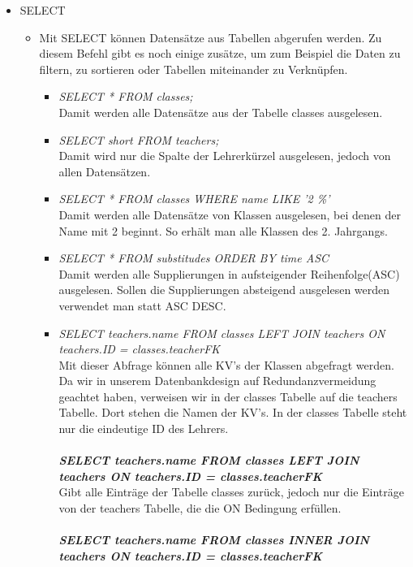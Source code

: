 \begin{itemize}
    \item SELECT
    	\begin{itemize}
	    	\item Mit SELECT können Datensätze aus Tabellen abgerufen werden. Zu diesem Befehl gibt es noch einige zusätze, um zum Beispiel die Daten zu filtern, zu sortieren oder Tabellen miteinander zu Verknüpfen.
	    	\begin{itemize}
		    	\item \textit{SELECT * FROM classes;}\\
		    		Damit werden alle Datensätze aus der Tabelle classes ausgelesen.
		    	\item \textit{SELECT short FROM teachers;}\\
			    	Damit wird nur die Spalte der Lehrerkürzel ausgelesen, jedoch von allen Datensätzen.
		    	\item \textit{SELECT * FROM classes WHERE name LIKE '2 \%'}\\
		    		Damit werden alle Datensätze von Klassen ausgelesen, bei denen der Name mit 2 beginnt. So erhält man alle Klassen des 2. Jahrgangs.
		    	\item \textit{SELECT * FROM substitudes ORDER BY time ASC}\\
		    		Damit werden alle Supplierungen in aufsteigender Reihenfolge(ASC) ausgelesen. Sollen die Supplierungen absteigend ausgelesen werden verwendet man statt ASC DESC.
		    	\item \textit{SELECT teachers.name FROM classes LEFT JOIN teachers ON teachers.ID = classes.teacherFK}\\
		    		Mit dieser Abfrage können alle KV's der Klassen abgefragt werden. Da wir in unserem Datenbankdesign auf Redundanzvermeidung geachtet haben, verweisen wir in der classes Tabelle auf die teachers Tabelle. Dort stehen die Namen der KV's. In der classes Tabelle steht nur die eindeutige ID des Lehrers.\\\\
		    		\textbf{\textit{SELECT teachers.name FROM classes LEFT JOIN teachers ON teachers.ID = classes.teacherFK}}\\
		    			Gibt alle Einträge der Tabelle classes zurück, jedoch nur die Einträge von der teachers Tabelle, die die ON Bedingung erfüllen.\\\\
		    		\textbf{\textit{SELECT teachers.name FROM classes INNER JOIN teachers ON teachers.ID = classes.teacherFK}}\\

\end{itemize}
\end{itemize}
\end{itemize}
